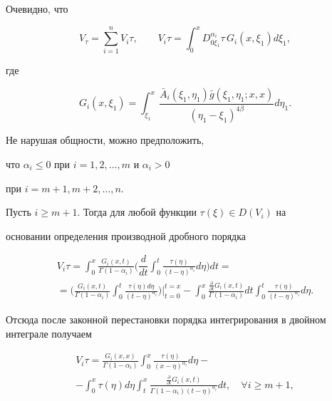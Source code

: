 Очевидно, что 

$$V_\tau=\sum\limits_{i=1}^n V_i \tau,\qquad  

V_i \tau= \int _0^x  D_{0\xi_1}^{\alpha_i}\tau\, G_i(x,\xi_1)d\xi_1,

$$

где

$$

G_i(x,\xi_1)= \int _{\xi_1}^x 

\frac{\bar{A}_i(\xi_1,\eta_1) \bar{g}(\xi_1,\eta_1;x,x)}{(\eta_1-\xi_1)^{4\beta}}d\eta_1.

$$



Не нарушая общности, можно предположить, 

что $\alpha_i\leqslant0$ при $i=1 , 2,\ldots,m$ и $\alpha_i>0$ 

при $i=m+1, m+2, \ldots,n$.



Пусть $i\geqslant m+1$. Тогда для любой функции $\tau(\xi)\in D(V_i)$ на 

основании определения производной дробного порядка

\begin{multline}

V_i \tau= \int _0^x \frac{G_i(x,t)}{\Gamma(1-\alpha_i)}

\biggl(\dfrac{d}{dt} 

 \int _0^t \frac{\tau(\eta)}{(t-\eta)^{\alpha_i}} d\eta\biggr) dt=

\\

=\biggl( \frac{G_i(x,t)}{\Gamma(1-\alpha_i)} \int _0^t

\frac{\tau(\eta)d\eta}{(t-\eta)^{\alpha_i}}

\biggr)\bigg|_{t=0}^{t=x} -

 \int _0^x \frac{\frac{\partial}{\partial t}G_i(x,t)}{\Gamma(1-\alpha_i)}dt 

 \int _0^t \frac{\tau(\eta)}{(t-\eta)^{\alpha_i}} d\eta.

\end{multline}



Отсюда после законной перестановки порядка интегрирования в двойном интеграле получаем

\begin{multline}

V_i \tau= \frac{G_i(x,x)}{\Gamma(1-\alpha_i)} \int _0^x 

\frac{\tau(\eta)}{(x-\eta)^{\alpha_i}} d\eta-

\\

- \int _0^x \tau(\eta)d\eta  \int _t^x 

\frac{\frac{\partial}{\partial t}G_i(x,t)}{\Gamma(1-\alpha_i)(t-\eta)^{\alpha_i}}dt, 

\quad \forall i\geqslant m+1,

\end{multline}

